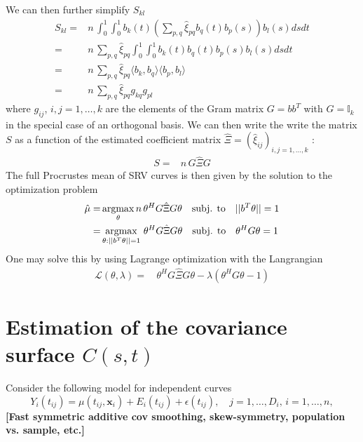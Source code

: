 We can then further simplify $S_{kl}$
\begin{align*}
    S_{kl} =& n \, \int_0^1 \int_0^1 b_k(t) \left( \sum_{p,q} \hat{\xi}_{pq} b_q(t) b_p(s) \right) b_l(s) ds dt\\
    =& n \, \sum_{p,q} \hat{\xi}_{pq} \int_0^1 \int_0^1 b_k(t) b_q(t) b_p(s) b_l(s) ds dt\\
    =& n \, \sum_{p,q} \hat{\xi}_{pq} \langle b_k, b_q \rangle \langle b_p, b_l \rangle\\
    =& n \, \sum_{p,q} \hat{\xi}_{pq} g_{kq} g_{pl}
\end{align*}
where $g_{ij}$, $i,j = 1, \dots, k$ are the elements of the Gram matrix $G = bb^T$ with $G = \mathbb{I}_k$ in the special case of an orthogonal basis.
We can then write the write the matrix $S$ as a function of the estimated coefficient matrix $\hat{\Xi} = (\hat{\xi}_{ij})_{i,j = 1, \dots, k}$ :
\begin{align*}
    S =& n \, G \hat{\Xi} G
\end{align*}
The full Procrustes mean of SRV curves is then given by the solution to the optimization problem
\begin{align*}
    \hat{\mu} =& \operatorname*{argmax}_{\theta} n \, \theta^H G \hat{\Xi} G \theta \quad \text{subj. to} \quad ||b^T \theta|| = 1 \\
    =& \operatorname*{argmax}_{\theta : ||b^T\theta||=1} \, \theta^H G \hat{\Xi} G \theta \quad \text{subj. to} \quad \theta^H G \theta = 1
\end{align*}
One may solve this by using Lagrange optimization with the Langrangian
\begin{align*}
  \mathcal{L}(\theta,\lambda) =& \, \theta^H G \hat{\Xi} G \theta - \lambda ( \theta^H G \theta - 1)
\end{align*}





\section{Estimation of the covariance surface $C(s,t)$}
Consider the following model for independent curves
\begin{equation}
    Y_i(t_{ij}) = \mu(t_{ij}, \mathbf{x}_i) + E_i(t_{ij}) + \epsilon(t_{ij}),
    \quad j = 1,\dots,D_i, \, i = 1,\dots,n,
\end{equation}
\textbf{[Fast symmetric additive cov smoothing, skew-symmetry, population vs. sample, etc.]}


